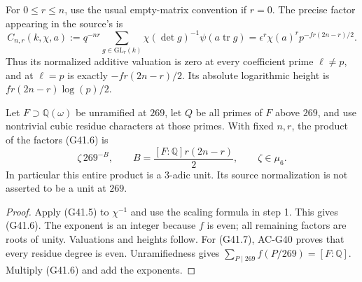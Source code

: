 \begin{corollary}
\label{AC-G41-normalization}
For $0\leq r\leq n$, use the usual empty-matrix convention if
$r=0$.  The precise factor appearing in the source's
 is
\[
 C_{n,r}(k,\chi,a)
   :=q^{-nr}\sum_{g\in\mathrm{GL}_r(k)}
                  \chi(\det g)^{-1}\psi(a\operatorname{tr}g)
   =\epsilon^r\chi(a)^r p^{-f r(2n-r)/2}.              \tag{G41.6}
\]
Thus its normalized additive valuation is zero at every
coefficient prime $\ell\ne p$, and at $\ell=p$ is exactly
$-fr(2n-r)/2$.  Its absolute logarithmic height is
$fr(2n-r)\log(p)/2$.

Let $F\supset\mathbb Q(\omega)$ be unramified at $269$, let
$Q$ be all primes of $F$ above $269$, and use nontrivial cubic
residue characters at those primes.  With fixed $n,r$, the
product of the factors (G41.6) is
\[
                \zeta\,269^{-B},\qquad
 B=\frac{[F:\mathbb Q]r(2n-r)}2,
                   \qquad \zeta\in\mu_6.              \tag{G41.7}
\]
In particular this entire product is a $3$-adic unit.  Its
source normalization is not asserted to be a unit at $269$.
\end{corollary}
\begin{proof}
Apply (G41.5) to $\chi^{-1}$ and use the scaling formula in
step 1.  This gives (G41.6).  The exponent is an integer
because $f$ is even; all remaining factors are roots of unity.
Valuations and heights follow.  For (G41.7), AC-G40 proves
that every residue degree is even.  Unramifiedness gives
$\sum_{P\mid269}f(P/269)=[F:\mathbb Q]$.  Multiply (G41.6)
and add the exponents.
\end{proof}

